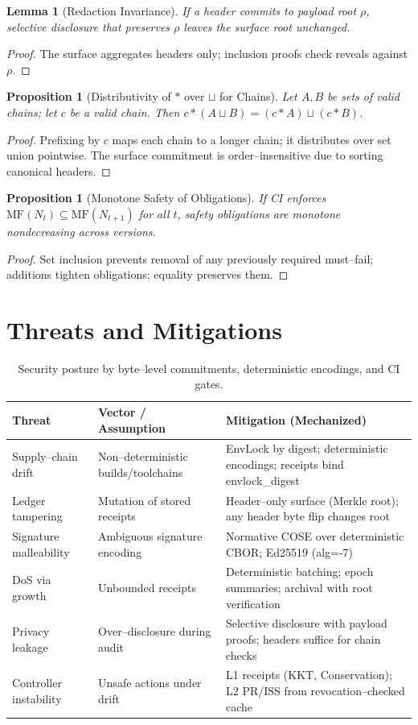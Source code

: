 \documentclass[11pt]{article}
\theoremstyle{plain}
\newtheorem{proposition}[theorem]{Proposition}
\newtheorem{lemma}[theorem]{Lemma}
\theoremstyle{definition}
\theoremstyle{remark}
\def\texttt#1{#1}%
\begin{document}
\begin{lemma}[Redaction Invariance]
If a header commits to payload root $\rho$, selective disclosure that preserves $\rho$ leaves the surface root unchanged.
\end{lemma}
\begin{proof}
The surface aggregates headers only; inclusion proofs check reveals against $\rho$.
\end{proof}

\begin{proposition}[Distributivity of $*$ over $\sqcup$ for Chains]
Let $A,B$ be sets of valid chains; let $c$ be a valid chain. Then $c*(A\sqcup B)=(c*A)\sqcup(c*B)$.
\end{proposition}
\begin{proof}
Prefixing by $c$ maps each chain to a longer chain; it distributes over set union pointwise. The surface commitment is order--insensitive due to sorting canonical headers.
\end{proof}

\begin{proposition}[Monotone Safety of Obligations]
If CI enforces $\mathrm{MF}(N_t)\subseteq \mathrm{MF}(N_{t+1})$ for all $t$, safety obligations are monotone nondecreasing across versions.
\end{proposition}
\begin{proof}
Set inclusion prevents removal of any previously required must--fail; additions tighten obligations; equality preserves them.
\end{proof}

\section{Threats and Mitigations}
\begin{table}[t]
\centering
\begin{tabular}{@{}p{3.1cm}p{5.9cm}p{6.1cm}@{}}
\toprule
\textbf{Threat} & \textbf{Vector / Assumption} & \textbf{Mitigation (Mechanized)}\\
\midrule
Supply--chain drift & Non--deterministic builds/toolchains & EnvLock by digest; deterministic encodings; receipts bind \texttt{envlock\_digest} \\
Ledger tampering & Mutation of stored receipts & Header--only surface (Merkle root); any header byte flip changes root \\
Signature malleability & Ambiguous signature encoding & Normative COSE over deterministic CBOR; Ed25519 (\texttt{alg=-7}) \\
DoS via growth & Unbounded receipts & Deterministic batching; epoch summaries; archival with root verification \\
Privacy leakage & Over--disclosure during audit & Selective disclosure with payload proofs; headers suffice for chain checks \\
Controller instability & Unsafe actions under drift & L1 receipts (KKT, Conservation); L2 PR/ISS from revocation--checked cache \\
\bottomrule
\end{tabular}
\caption{Security posture by byte--level commitments, deterministic encodings, and CI gates.}
\end{table}
\end{document}
